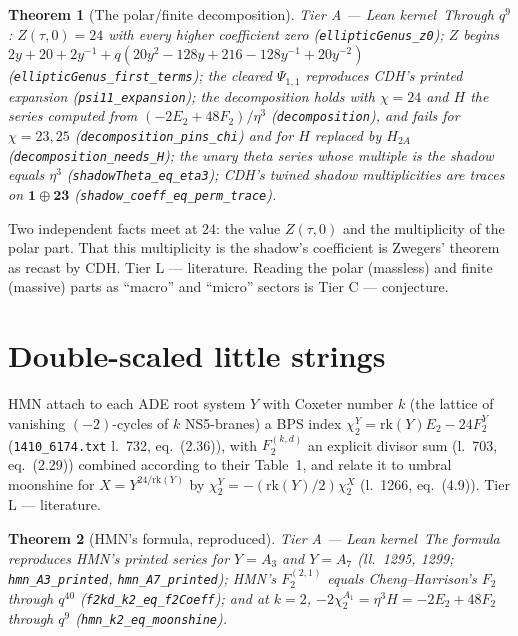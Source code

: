 \documentclass[11pt,a4paper]{article}
\newtheorem{theorem}{Theorem}[section]
\theoremstyle{remark}
\newcommand{\tierA}{\colorbox{green!15}{\textsf{\scriptsize Tier A --- Lean kernel}}}
\newcommand{\tierL}{\colorbox{blue!10}{\textsf{\scriptsize Tier L --- literature}}}
\newcommand{\tierC}{\colorbox{orange!15}{\textsf{\scriptsize Tier C --- conjecture}}}
\newcommand{\lean}[1]{\texttt{#1}}
\begin{document}
\begin{theorem}[The polar/finite decomposition] \tierA\
Through $q^9$: $Z(\tau,0)=24$ with every higher coefficient zero (\lean{ellipticGenus\_z0}); $Z$ begins
$2y+20+2y^{-1}+q(20y^2-128y+216-128y^{-1}+20y^{-2})$ (\lean{ellipticGenus\_first\_terms}); the cleared
$\Psi_{1,1}$ reproduces CDH's printed expansion (\lean{psi11\_expansion}); the decomposition holds with
$\chi=24$ and $H$ the series computed from $(-2E_2+48F_2)/\eta^3$ (\lean{decomposition}), and fails for
$\chi=23,25$ (\lean{decomposition\_pins\_chi}) and for $H$ replaced by $H_{2A}$
(\lean{decomposition\_needs\_H}); the unary theta series whose multiple is the shadow equals $\eta^3$
(\lean{shadowTheta\_eq\_eta3}); CDH's twined shadow multiplicities are traces on $\mathbf{1}\oplus\mathbf{23}$
(\lean{shadow\_coeff\_eq\_perm\_trace}).
\end{theorem}
Two independent facts meet at $24$: the value $Z(\tau,0)$ and the multiplicity of the polar part. That
this multiplicity is the shadow's coefficient is Zwegers' theorem as recast by CDH. \tierL. Reading the
polar (massless) and finite (massive) parts as ``macro'' and ``micro'' sectors is \tierC.

\section{Double-scaled little strings}
\label{sec:hmn}
HMN attach to each ADE root system $Y$ with Coxeter number $k$ (the lattice of vanishing $(-2)$-cycles of
$k$ NS5-branes) a BPS index $\chi_2^Y=\mathrm{rk}(Y)E_2-24F_2^Y$ (\texttt{1410\_6174.txt} l.~732,
eq.~(2.36)), with $F_2^{(k,d)}$ an explicit divisor sum (l.~703, eq.~(2.29)) combined according to their
Table~1, and relate it to umbral moonshine for $X=Y^{24/\mathrm{rk}(Y)}$ by
$\chi_2^Y=-(\mathrm{rk}(Y)/2)\chi_2^X$ (l.~1266, eq.~(4.9)). \tierL.

\begin{theorem}[HMN's formula, reproduced] \tierA\
The formula reproduces HMN's printed series for $Y=A_3$ and $Y=A_7$ (ll.~1295, 1299;
\lean{hmn\_A3\_printed}, \lean{hmn\_A7\_printed}); HMN's $F_2^{(2,1)}$ equals Cheng--Harrison's $F_2$
through $q^{40}$ (\lean{f2kd\_k2\_eq\_f2Coeff}); and at $k=2$, $-2\chi_2^{A_1}=\eta^3H=-2E_2+48F_2$ through
$q^9$ (\lean{hmn\_k2\_eq\_moonshine}).
\end{theorem}
\end{document}
